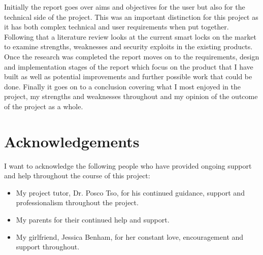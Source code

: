 Initially the report goes over aims and objectives for the user but also for the technical side of the project. This was an important distinction for this project as it has both complex technical and user requirements when put together. Following that a literature review looks at the current smart locks on the market to examine strengths, weaknesses and security exploits in the existing products. Once the research was completed the report moves on to the requirements, design and implementation stages of the report which focus on the product that I have built as well as potential improvements and further possible work that could be done. Finally it goes on to a conclusion covering what I most enjoyed in the project, my strengths and weaknesses throughout and my opinion of the outcome of the project as a whole.


\chapter*{Acknowledgements}

I want to acknowledge the following people who have provided ongoing support and help throughout the course of this project:
\begin{itemize}
	\item My project tutor, Dr. Posco Tso, for his continued guidance, support and professionalism throughout the project.
	\item My parents for their continued help and support.
	\item My girlfriend, Jessica Benham, for her constant love, encouragement and support throughout.
\end{itemize}

\setcounter{tocdepth}{2}
\tableofcontents

\listoffigures
{}

\newpage

